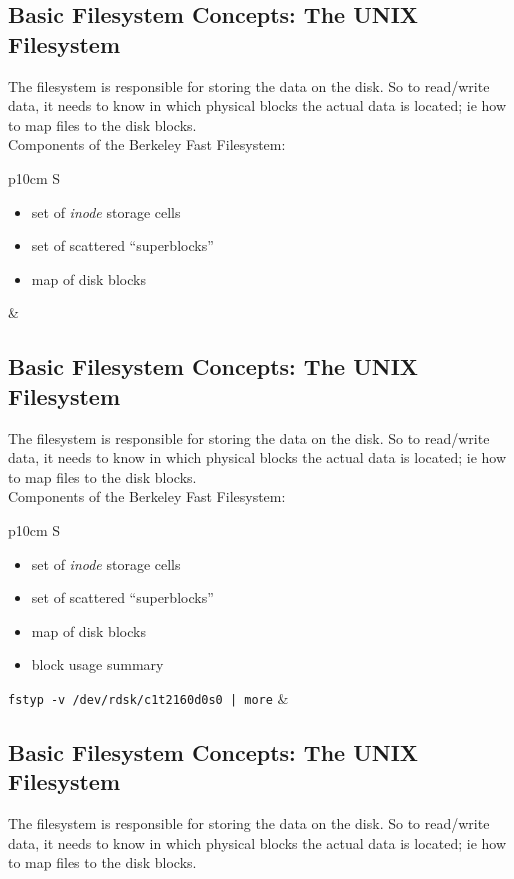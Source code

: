 \documentclass[xga]{xdvislides}
\begin{document}
\subsection{Basic Filesystem Concepts: The UNIX Filesystem}
The filesystem is responsible for storing the data on the disk.
So to read/write data, it needs to know in which physical blocks the actual
data is located; ie how to map files to the disk blocks.
\\

Components of the Berkeley Fast Filesystem:
\\

\begin{tabular}{ p{10cm} S }
\begin{itemize}
	\item set of {\em inode} storage cells
	\item set of scattered ``superblocks''
	\item map of disk blocks
\end{itemize}
&  \\
\end{tabular}

\subsection{Basic Filesystem Concepts: The UNIX Filesystem}
The filesystem is responsible for storing the data on the disk.
So to read/write data, it needs to know in which physical blocks the actual
data is located; ie how to map files to the disk blocks.
\\

Components of the Berkeley Fast Filesystem:
\\

\begin{tabular}{ p{10cm} S }
\begin{itemize}
	\item set of {\em inode} storage cells
	\item set of scattered ``superblocks''
	\item map of disk blocks
	\item block usage summary
\end{itemize}
{\tt fstyp -v /dev/rdsk/c1t2160d0s0  | more}
&  \\
\end{tabular}

\subsection{Basic Filesystem Concepts: The UNIX Filesystem}
The filesystem is responsible for storing the data on the disk.
So to read/write data, it needs to know in which physical blocks the actual
data is located; ie how to map files to the disk blocks.
\\
\end{document}
